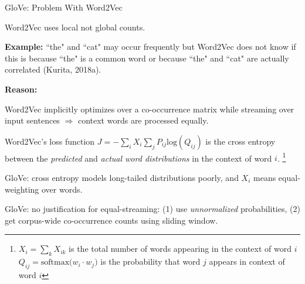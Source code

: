 \begin{frame}{GloVe: Problem With Word2Vec}
    \vspace{20pt}
    
    \begin{itemizeSpaced}{4pt}
         Word2Vec uses local not global counts.  
        \begin{itemizeSpaced}{0pt}
            \pinkbox \textbf{Example: }``the" and ``cat" may occur frequently but Word2Vec does not know if this is because ``the" is a common word or because ``the" and ``cat" are actually correlated  (Kurita, 2018a). 
            
        \end{itemizeSpaced}
        
        \item \textbf{Reason: } 
        \begin{itemizeSpaced}{7pt}
            \pinkbox Word2Vec implicitly optimizes over a co-occurrence matrix while streaming over input sentences $\Rightarrow$ context words are processed equally.
            
            \item Word2Vec's loss function $J = - \sum_i X_i \sum_j P_{ij} \text{log}(Q_{ij}) $ is the cross entropy between the \emph{predicted} and \emph{actual word distributions} in the context of word $i$. \footnote{$X_i = \sum_k X_{ik}$ is the total number of words appearing in the context of word $i$ \newline $Q_{ij} = \text{softmax} \Big( w_i \cdot w_j \Big)$ is the probability that word $j$ appears in context of word $i$} 
            
            \item GloVe: cross entropy models long-tailed distributions poorly, and $X_i$ means equal-weighting over words. 
            
            \pinkbox GloVe: no justification for equal-streaming: (1) use \emph{unnormalized} probabilities, (2) get corpus-wide co-occurrence counts using sliding window.
            
        \end{itemizeSpaced}
        
    \end{itemizeSpaced}
    
    
\end{frame}




